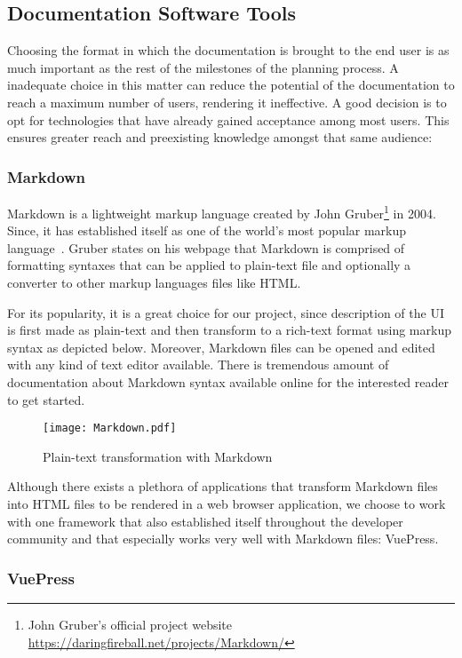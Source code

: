 \subsection{Documentation Software Tools}

Choosing the format in which the documentation is brought to the end user is as much important as the rest of the milestones of the planning process. A inadequate choice in this matter can reduce the potential of the documentation to reach a maximum number of users, rendering it ineffective. A good decision is to opt for technologies that have already gained acceptance among most users. This ensures greater reach and preexisting knowledge amongst that same audience:

\subsubsection{Markdown}\label{sec:MD}

Markdown is a lightweight markup language created by John Gruber\footnote{John Gruber's official project website \url{https://daringfireball.net/projects/Markdown/}} in 2004. Since, it has established itself as one of the world's most popular markup language~\cite{Markdown}. Gruber states on his webpage that Markdown is comprised of formatting syntaxes that can be applied to plain-text file and optionally a converter to other markup languages files like HTML.

For its popularity, it is a great choice for our project, since description of the UI is first made as plain-text and then transform to a rich-text format using markup syntax as depicted below. Moreover, Markdown files can be opened and edited with any kind of text editor available. There is tremendous amount of documentation about Markdown syntax available online for the interested reader to get started.

\begin{figure}[h]
    \centering
    \texttt{[image: Markdown.pdf]}
    \caption{Plain-text transformation with Markdown}
    \label{fig:Markdown}
\end{figure}

Although there exists a plethora of applications that transform Markdown files into HTML files to be rendered in a web browser application, we choose to work with one framework that also established itself throughout the developer community and that especially works very well with Markdown files: VuePress.

\subsubsection{VuePress}\label{sec:VP}

